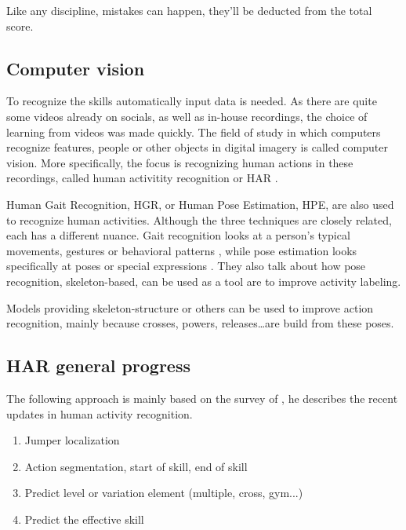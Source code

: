 Like any discipline, mistakes can happen, they'll be deducted from the total score.

\subsection{Computer vision}
\label{subsec:computer vision}

To recognize the skills automatically input data is needed. As there are quite some videos already on socials, as well as in-house recordings, the choice of learning from videos was made quickly. The field of study in which computers recognize features, people or other objects in digital imagery is called computer vision. More specifically, the focus is recognizing human actions in these recordings, called human activitity recognition or HAR \autocite{Pareek_2020}.

Human Gait Recognition, HGR, or Human Pose Estimation, HPE, are also used to recognize human activities. Although the three techniques are closely related, each has a different nuance. Gait recognition looks at a person's typical movements, gestures or behavioral patterns \autocite{Alharthi_2019}, while pose estimation looks specifically at poses or special expressions \autocite{Song_2021}. They also talk about how pose recognition, skeleton-based, can be used as a tool are to improve activity labeling.

Models providing skeleton-structure or others can be used to improve action recognition, mainly because crosses, powers, releases\dots are build from these poses.

\subsection{HAR general progress}

The following approach is mainly based on the survey of \textcite{Pareek_2020}, he describes the recent updates in human activity recognition. 

\begin{enumerate}
    \item Jumper localization
    \item Action segmentation, start of skill, end of skill
    \item Predict level or variation element (multiple, cross, gym...)
    \item Predict the effective skill
\end{enumerate}

